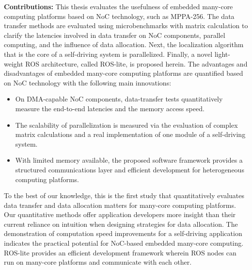 
\textbf{Contributions:}
This thesis evaluates the usefulness of embedded many-core computing platforms based on NoC technology, such as MPPA-256.
The data transfer methods are evaluated using microbenchmarks with matrix calculation to clarify the latencies involved in data transfer on NoC components, parallel computing, and the influence of data allocation.
Next, the localization algorithm that is the core of a self-driving system is parallelized.
Finally, a novel light-weight ROS architecture, called ROS-lite, is proposed herein.
The advantages and disadvantages of embedded many-core computing platforms are quantified based on NoC technology with the following main innovations:

\begin{itemize}
  \setlength{\leftskip}{-5mm}
  \item On DMA-capable NoC components, data-transfer tests quantitatively measure the end-to-end latencies and the memory access speed.
  \item The scalability of parallelization is measured via the evaluation of complex matrix calculations and a real implementation of one module of a self-driving system.
  \item With limited memory available, the proposed software framework provides a structured communications layer and efficient development for heterogeneous computing platforms.
\end{itemize}

To the best of our knowledge, this is the first study that quantitatively evaluates data transfer and data allocation matters for many-core computing platforms.
Our quantitative methods offer application developers more insight than their current reliance on intuition when designing strategies for data allocation. 
The demonstration of computation speed improvements for a self-driving application indicates the practical potential for NoC-based embedded many-core computing.
ROS-lite provides an efficient development framework wherein ROS nodes can run on many-core platforms and communicate with each other.

